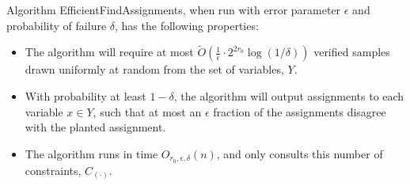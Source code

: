 \documentclass[anon,12pt]{colt2018}
\newcommand{\eps}{\epsilon}
\begin{document}
\begin{proposition}
Algorithm EfficientFindAssignments, when run with error parameter $\eps$ and probability of failure $\delta$, has the following properties:
\begin{itemize}
\item The algorithm will require at most $\tilde{O}\left(\frac{1}{\eps} \cdot 2^{2 r_0} \log(1/\delta)\right)$ verified samples drawn uniformly at random from the set of variables, $Y$.
\item With probability at least $1-\delta$, the algorithm will output assignments to each variable $x \in Y$, such that at most an $\eps$ fraction of the assignments disagree with the planted assignment.
\item  The algorithm runs in time $O_{r_0,\eps,\delta}(n)$, and only consults this number of constraints, $C_{(\cdot)}$.
\end{itemize}\end{proposition}
\end{document}
